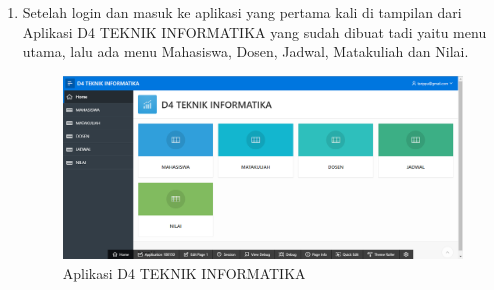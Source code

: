 \begin{enumerate}
    \newpage
    
    \item Setelah login dan masuk ke aplikasi yang pertama kali di tampilan dari Aplikasi D4 TEKNIK INFORMATIKA yang sudah dibuat tadi yaitu menu utama, lalu ada menu Mahasiswa, Dosen, Jadwal, Matakuliah dan Nilai.
        \begin{figure}[!htbp]
        \centering
        \includegraphics[width=13cm]{figures/17.PNG}
        \caption{Aplikasi D4 TEKNIK INFORMATIKA}
    \end{figure}
\end{enumerate}
